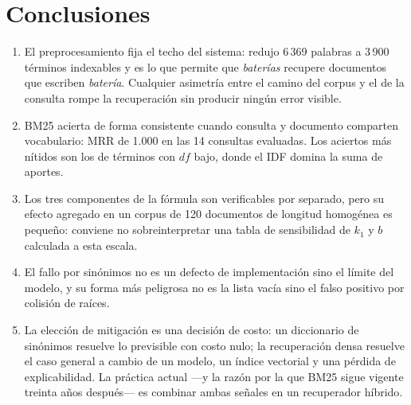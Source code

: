 \documentclass[10pt,a4paper]{article}
\begin{document}
\section{Conclusiones}

\begin{enumerate}
  \item El preprocesamiento fija el techo del sistema: redujo 6\,369 palabras a 3\,900 términos
        indexables y es lo que permite que \emph{baterías} recupere documentos que escriben
        \emph{batería}. Cualquier asimetría entre el camino del corpus y el de la consulta rompe la
        recuperación sin producir ningún error visible.
  \item BM25 acierta de forma consistente cuando consulta y documento comparten vocabulario:
        MRR de 1.000 en las 14 consultas evaluadas. Los aciertos más nítidos son los de términos con
        $\mathit{df}$ bajo, donde el IDF domina la suma de aportes.
  \item Los tres componentes de la fórmula son verificables por separado, pero su efecto agregado en
        un corpus de 120 documentos de longitud homogénea es pequeño: conviene no sobreinterpretar
        una tabla de sensibilidad de $k_1$ y $b$ calculada a esta escala.
  \item El fallo por sinónimos no es un defecto de implementación sino el límite del modelo, y su
        forma más peligrosa no es la lista vacía sino el falso positivo por colisión de raíces.
  \item La elección de mitigación es una decisión de costo: un diccionario de sinónimos resuelve lo
        previsible con costo nulo; la recuperación densa resuelve el caso general a cambio de un
        modelo, un índice vectorial y una pérdida de explicabilidad. La práctica actual —y la razón
        por la que BM25 sigue vigente treinta años después— es combinar ambas señales en un
        recuperador híbrido.
\end{enumerate}
\end{document}
